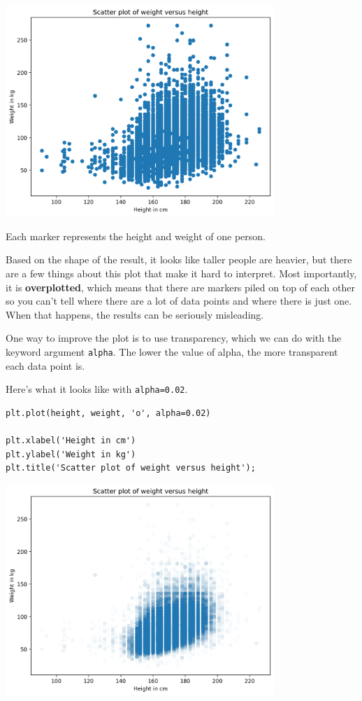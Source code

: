 \begin{center}
\includegraphics[width=4in]{chapters/09_relationships_files/09_relationships_12_0.png}
\end{center}

Each marker represents the height and weight of one person.

Based on the shape of the result, it looks like taller people are
heavier, but there are a few things about this plot that make it hard to
interpret. Most importantly, it is \textbf{overplotted}, which means
that there are markers piled on top of each other so you can't tell
where there are a lot of data points and where there is just one. When
that happens, the results can be seriously misleading.

One way to improve the plot is to use transparency, which we can do with
the keyword argument \passthrough{\lstinline!alpha!}. The lower the
value of alpha, the more transparent each data point is.

Here's what it looks like with \passthrough{\lstinline!alpha=0.02!}.

\begin{lstlisting}[]
plt.plot(height, weight, 'o', alpha=0.02)

plt.xlabel('Height in cm')
plt.ylabel('Weight in kg')
plt.title('Scatter plot of weight versus height');
\end{lstlisting}

\begin{center}
\includegraphics[width=4in]{chapters/09_relationships_files/09_relationships_14_0.png}
\end{center}

